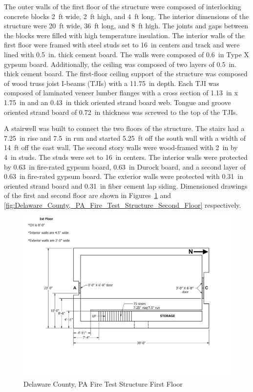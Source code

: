 \documentclass[12pt,oneside]{book}
\begin{document}
The outer walls of the first floor of the structure were composed of interlocking concrete blocks 2~ft wide, 2~ft high, and 4~ft long. The interior dimensions of the structure were 20~ft wide, 36~ft long, and 8~ft high. The joints and gaps between the blocks were filled with high temperature insulation. The interior walls of the first floor were framed with steel studs set to 16~in centers and track and were lined with 0.5~in. thick cement board. The walls were composed of 0.6~in Type X gypsum board. Additionally, the ceiling was composed of two layers of 0.5~in. thick cement board. The first-floor ceiling support of the structure was composed of wood truss joist I-beams (TJIs) with a 11.75~in depth. Each TJI was composed of laminated veneer lumber flanges with a cross section of 1.13~in x 1.75~in and an 0.43~in thick oriented strand board web. Tongue and groove oriented strand board of 0.72~in thickness was screwed to the top of the TJIs. 

A stairwell was built to connect the two floors of the structure. The stairs had a 7.25~in rise and 7.5~in run and started 5.25~ft off the south wall with a width of 14~ft off the east wall. The second story walls were wood-framed with 2~in by 4~in studs. The studs were set to 16~in centers. The interior walls were protected by 0.63~in fire-rated gypsum board, 0.63~in Durock board, and a second layer of 0.63~in fire-rated gypsum board. The exterior walls were protected with 0.31~in oriented strand board and 0.31~in fiber cement lap siding. Dimensioned drawings of the first and second floor are shown in Figures~\ref{fig:Delaware_County,_PA_Fire_Test_Structure_First_Floor} and \ref{fig:Delaware_County,_PA_Fire_Test_Structure_Second_Floor} respectively.

\begin{figure}[!ht]
	\centering
	\includegraphics[width=\columnwidth]{Figures/Air_Entrainment/West_Test_Structure_1st_Floor_original_nodim.pdf}
	\caption{Delaware County, PA Fire Test Structure First Floor}
	\label{fig:Delaware_County,_PA_Fire_Test_Structure_First_Floor}
\end{figure}
\end{document}
